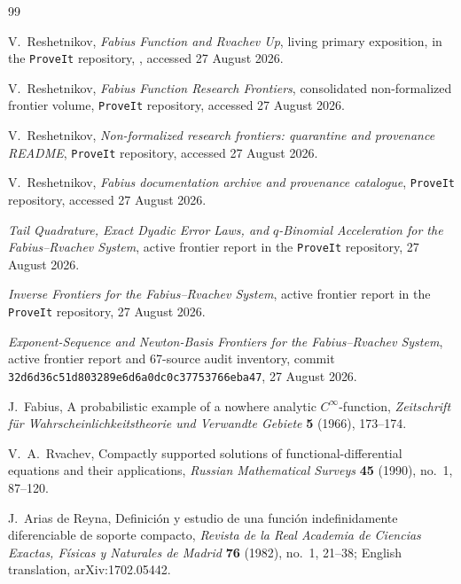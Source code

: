 \documentclass[11pt,oneside]{article}
\theoremstyle{definition}
\theoremstyle{remark}
\newcommand{\1}{\mathbf 1}
\begin{document}
\begin{thebibliography}{99}

V.~Reshetnikov,
\newblock \emph{Fabius Function and Rvachev Up}, living primary exposition,
\newblock in the \texttt{ProveIt} repository, , accessed 27 August 2026.

V.~Reshetnikov,
\newblock \emph{Fabius Function Research Frontiers}, consolidated non-formalized frontier volume,
\newblock \texttt{ProveIt} repository, accessed 27 August 2026.

V.~Reshetnikov,
\newblock \emph{Non-formalized research frontiers: quarantine and provenance README},
\newblock \texttt{ProveIt} repository, accessed 27 August 2026.

V.~Reshetnikov,
\newblock \emph{Fabius documentation archive and provenance catalogue},
\newblock \texttt{ProveIt} repository, accessed 27 August 2026.

\emph{Tail Quadrature, Exact Dyadic Error Laws, and $q$-Binomial Acceleration for the Fabius--Rvachev System},
\newblock active frontier report in the \texttt{ProveIt} repository, 27 August 2026.

\emph{Inverse Frontiers for the Fabius--Rvachev System},
\newblock active frontier report in the \texttt{ProveIt} repository, 27 August 2026.

\emph{Exponent-Sequence and Newton-Basis Frontiers for the Fabius--Rvachev System},
\newblock active frontier report and 67-source audit inventory,
\newblock commit \texttt{32d6d36c51d803289e6d6a0dc0c37753766eba47}, 27 August 2026.

J.~Fabius,
\newblock A probabilistic example of a nowhere analytic $C^\infty$-function,
\newblock \emph{Zeitschrift f\"ur Wahrscheinlichkeitstheorie und Verwandte Gebiete}
\textbf{5} (1966), 173--174.

V.~A.~Rvachev,
\newblock Compactly supported solutions of functional-differential equations and their applications,
\newblock \emph{Russian Mathematical Surveys} \textbf{45} (1990), no.~1, 87--120.

J.~Arias de Reyna,
\newblock Definici\'on y estudio de una funci\'on indefinidamente diferenciable de soporte compacto,
\newblock \emph{Revista de la Real Academia de Ciencias Exactas, F\'isicas y Naturales de Madrid}
\textbf{76} (1982), no.~1, 21--38;
\newblock English translation, arXiv:1702.05442.


\end{thebibliography}
\end{document}
